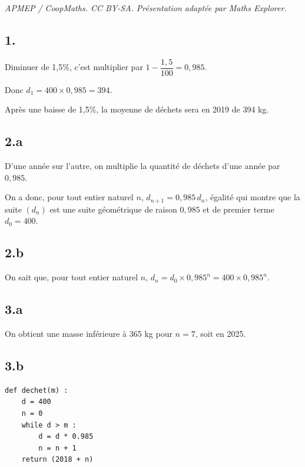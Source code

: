 \documentclass[10pt]{article}
\begin{document}
\noindent\textit{APMEP / CoopMaths. CC BY-SA. Présentation adaptée par Maths Explorer.}\par\medskip
\subsection*{1.}
	Diminuer de 1,5\%, c'est multiplier par \(1 - \dfrac{1,5}{100} = 0,985\).
	
	Donc \(d_1 = 400 \times 0,985 = 394\).
	
	Après une baisse de 1,5\%, la moyenne de déchets sera en 2019 de 394 kg.
	
	\subsection*{2.a}
	
	D'une année sur l'autre, on multiplie la quantité de déchets d'une année par \( 0,985 \).
	
	On a donc, pour tout entier naturel \( n \), \( d_{n+1} = 0,985 \, d_n \), égalité qui montre que la suite \( (d_n) \) est une suite géométrique de raison \( 0,985 \) et de premier terme \( d_0 = 400 \).
	
	\subsection*{2.b}
	
	On sait que, pour tout entier naturel \( n \), \( d_n = d_0 \times 0,985^n = 400 \times 0,985^n \).
	
	\subsection*{3.a}
	
	On obtient une masse inférieure à 365 kg pour \( n = 7 \), soit en 2025.
	
	\subsection*{3.b}
	\begin{lstlisting}[style=python]
def dechet(m) :
	d = 400
	n = 0
	while d > m :
		d = d * 0.985
		n = n + 1
	return (2018 + n)
	\end{lstlisting}
\end{document}
